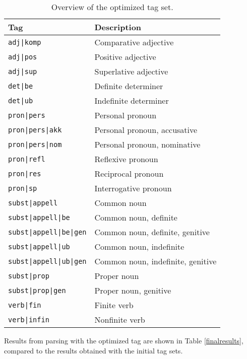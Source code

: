 \documentclass[11pt,a4paper]{article}
\begin{document}
\begin{table}
    \centering
    \smaller[1]
    \begin{tabular}{@{}ll@{}}
        \toprule
        \textbf{Tag} & \textbf{Description} \\
        \midrule
        \texttt{adj|komp} & Comparative adjective \\
        \texttt{adj|pos} & Positive adjective \\
        \texttt{adj|sup} & Superlative adjective \\
        \texttt{det|be} & Definite determiner \\
        \texttt{det|ub} & Indefinite determiner \\
        \texttt{pron|pers} & Personal pronoun \\
        \texttt{pron|pers|akk} & Personal pronoun, accusative \\
        \texttt{pron|pers|nom} & Personal pronoun, nominative \\
        \texttt{pron|refl} & Reflexive pronoun \\
        \texttt{pron|res} & Reciprocal pronoun \\
        \texttt{pron|sp} & Interrogative pronoun \\
        \texttt{subst|appell} & Common noun \\
        \texttt{subst|appell|be} & Common noun, definite \\
        \texttt{subst|appell|be|gen} & Common noun, definite, genitive \\
        \texttt{subst|appell|ub} & Common noun, indefinite \\
        \texttt{subst|appell|ub|gen} & Common noun, indefinite, genitive \\
        \texttt{subst|prop} & Proper noun \\
        \texttt{subst|prop|gen} & Proper noun, genitive \\
        \texttt{verb|fin} & Finite verb \\
        \texttt{verb|infin} & Nonfinite verb \\
        \bottomrule
    \end{tabular}
    \caption{Overview of the optimized tag set.}
    \label{optimizedtagset}
\end{table}

Results from parsing with the optimized tag are shown in Table
\ref{finalresults}, compared to the results obtained with the initial tag sets.
\end{document}
